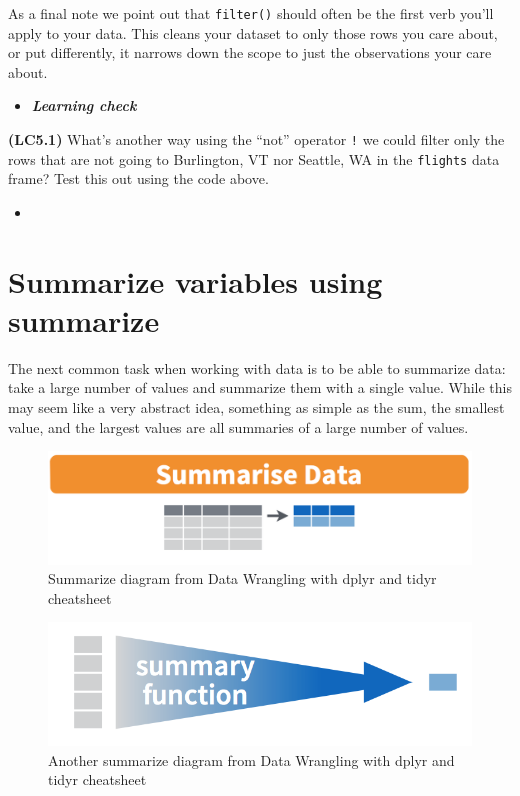 \documentclass[12pt,]{krantz}
\newenvironment{rmdblock}[1]
  {\begin{shaded*}
  \begin{itemize}
  \renewcommand{\labelitemi}{
    \raisebox{-.7\height}[0pt][0pt]{
    }
  }
  \item
  }
  {
  \end{itemize}
  \end{shaded*}
  }
\newenvironment{learncheck}
  {\begin{rmdblock}{warning}}
  {\end{rmdblock}}
\theoremstyle{definition}
\theoremstyle{definition}
\theoremstyle{definition}
\theoremstyle{remark}
\begin{document}
As a final note we point out that \texttt{filter()} should often be the
first verb you'll apply to your data. This cleans your dataset to only
those rows you care about, or put differently, it narrows down the scope
to just the observations your care about.

\begin{learncheck}
\textbf{\emph{Learning check}}
\end{learncheck}

\textbf{(LC5.1)} What's another way using the ``not'' operator
\texttt{!} we could filter only the rows that are not going to
Burlington, VT nor Seattle, WA in the \texttt{flights} data frame? Test
this out using the code above.

\begin{learncheck}

\end{learncheck}

\section{Summarize variables using summarize}\label{summarize}

The next common task when working with data is to be able to summarize
data: take a large number of values and summarize them with a single
value. While this may seem like a very abstract idea, something as
simple as the sum, the smallest value, and the largest values are all
summaries of a large number of values.

\begin{figure}

{\centering \includegraphics[width=\textwidth]{images/summarize1} 

}

\caption{Summarize diagram from Data Wrangling with dplyr and tidyr cheatsheet}\label{fig:sum1}
\end{figure}

\begin{figure}

{\centering \includegraphics[width=\textwidth]{images/summary} 

}

\caption{Another summarize diagram from Data Wrangling with dplyr and tidyr cheatsheet}\label{fig:sum2}
\end{figure}
\end{document}
